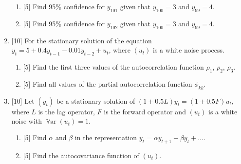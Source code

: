 \documentclass[12pt]{article}
\DeclareMathOperator{\Var}{\mathbb{V}ar}
\begin{document}
\begin{enumerate}
    \begin{enumerate}
        \item {[5]} Find 95\% confidence for $y_{101}$ given that $y_{100} = 3$ and $y_{99} = 4$.
        \item {[5]} Find 95\% confidence for $y_{102}$ given that $y_{100} = 3$ and $y_{99} = 4$.
    \end{enumerate}
    
    \item {[10]} For the stationary solution of the equation $y_t = 5 + 0.4 y_{t-1} - 0.01 y_{t-2} + u_t$, 
    where $(u_t)$ is a white noise process. 
    \begin{enumerate}
        \item {[5]} Find the first three values of the autocorrelation function $\rho_1$, $\rho_2$, $\rho_3$.
        \item {[5]} Find all values of the partial autocorrelation function $\phi_{kk}$.
    \end{enumerate}

    \item {[10]} Let $(y_t)$ be a stationary solution of $(1+0.5L)y_t = (1 + 0.5F)u_t$,
    where $L$ is the lag operator, $F$ is the forward operator and $(u_t)$ is a white noise with $\Var(u_t) = 1$.
    \begin{enumerate}
        \item {[5]} Find $\alpha$ and $\beta$ in the representation $y_t = \alpha y_{t+1} + \beta y_t + \dots$.
        \item {[5]} Find the autocovariance function of $(u_t)$.
    \end{enumerate}
\end{enumerate}
\end{document}
